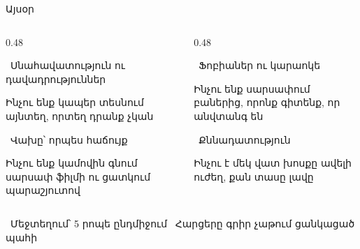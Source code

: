 \begin{frame}{Այսօր}
  \begin{columns}[T]
    \begin{column}{0.48\textwidth}
      \begin{card}[colback=lavender!40!cream]
        \ {\blackfont Սնահավատություն ու դավադրություններ}\par\smallskip
        Ինչու ենք կապեր տեսնում այնտեղ, որտեղ դրանք չկան
      \end{card}
      \begin{card}[colback=peach!45!cream]
        \ {\blackfont Վախը՝ որպես հաճույք}\par\smallskip
        Ինչու ենք կամովին գնում սարսափ ֆիլմի ու ցատկում պարաշյուտով
      \end{card}
    \end{column}
    \begin{column}{0.48\textwidth}
      \begin{card}[colback=mint!40!cream]
        \ {\blackfont Ֆոբիաներ ու կարաոկե}\par\smallskip
        Ինչու ենք սարսափում բաներից, որոնք գիտենք, որ անվտանգ են
      \end{card}
      \begin{card}[colback=brainpink!35!cream]
        \ {\blackfont Քննադատություն}\par\smallskip
        Ինչու է մեկ վատ խոսքը ավելի ուժեղ, քան տասը լավը
      \end{card}
    \end{column}
  \end{columns}
  \vspace{2mm}
  \centering
  {\small {}\ Մեջտեղում՝ 5 րոպե ընդմիջում \qquad {}\ Հարցերը գրիր չաթում ցանկացած պահի}
\end{frame}
